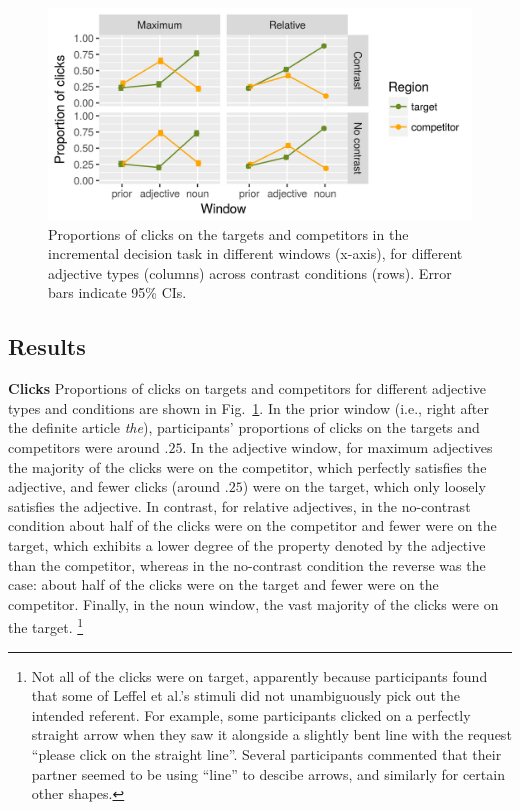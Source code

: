 \documentclass[10pt,letterpaper]{article}
\begin{document}
\begin{figure}[ht]
  \centering
  \includegraphics[width=.6\textwidth]{plots/clickdat.png}
  \caption{Proportions of clicks on the targets and competitors in the incremental decision task in different
    windows (x-axis), for different adjective types (columns) across contrast conditions (rows). Error bars indicate 95\% CIs.}
  \vspace{-4ex}
  \label{fig:clickdata}
\end{figure}

\subsection{Results}


\noindent \textbf{Clicks} \quad
Proportions of clicks on targets and competitors for different adjective types and conditions are shown in Fig.~\ref{fig:clickdata}. 
In the prior window (i.e., right after the definite article \emph{the}), participants' proportions of clicks 
 on the targets and competitors were around $.25$.
In the adjective window, for maximum adjectives the majority of the clicks were on the competitor, which 
 perfectly satisfies the adjective, and fewer clicks (around $.25$) were on the target, which only loosely
 satisfies the adjective. 
In contrast, for relative adjectives, in the no-contrast condition 
 about half of the clicks were on the competitor and fewer were on the target, 
 which exhibits a lower degree of the property denoted by the adjective than the competitor, whereas in the no-contrast condition the reverse was the case: about half of the clicks were on the target and fewer were on the competitor.
Finally, in the noun window, the vast majority of the clicks were on the target.%
\footnote{Not all of the clicks were on target, apparently because participants found that some of Leffel et al.'s stimuli did not unambiguously pick out the intended referent.
For example, some participants clicked on a perfectly straight arrow when they saw it alongside a slightly bent line with the request ``please click on the straight line''. Several participants commented that their partner seemed to be using ``line'' to descibe arrows, and similarly for certain other shapes.}
 
\end{document}
